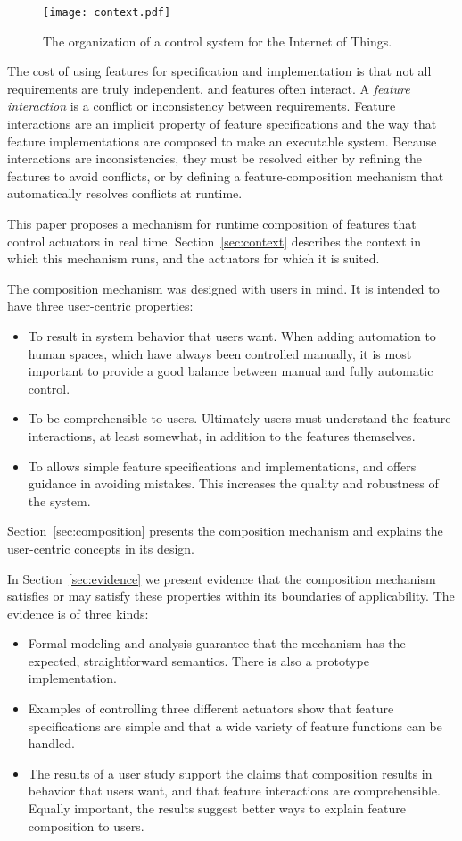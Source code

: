 \documentclass[conference]{IEEEtran}
\begin{document}
\begin{figure*}[!t]
\centering
\texttt{[image: context.pdf]}
\caption{The organization of a control system for the Internet of Things.}
\label{fig:context}
\end{figure*}

The cost of using features for specification and implementation is
that not all requirements are truly independent, and features often
interact.
A {\it feature interaction} is a conflict
or inconsistency between requirements.
Feature interactions are an implicit property of feature specifications
and the way that feature implementations
are composed to make an executable system.
Because interactions are inconsistencies, they must be resolved either by
refining the features to avoid conflicts,
or by defining a feature-composition mechanism that
automatically resolves conflicts at runtime.

This paper proposes a mechanism for runtime composition of features
that control actuators in real time.
Section~\ref{sec:context} describes the context in which this mechanism
runs, and the actuators for which it is suited.

The composition mechanism was designed with users in mind.
It is intended to have three user-centric properties:
\begin{itemize}
\item
To result in system behavior that users want.
When adding automation to human spaces, which have always been controlled
manually, it is most important to provide a good balance between
manual and fully automatic control.
\item
To be comprehensible to users.
Ultimately users must understand the feature interactions, at
least somewhat, in addition
to the features themselves.
\item
To allows simple feature specifications and implementations,
and offers guidance in avoiding mistakes.
This increases the quality and robustness of the system.
\end{itemize}
Section~\ref{sec:composition} presents the composition mechanism and 
explains the user-centric concepts in its design.

In Section~\ref{sec:evidence} we present evidence that the composition
mechanism satisfies or may satisfy these properties within its
boundaries of applicability.
The evidence is of three kinds:
\begin{itemize}
\item
Formal modeling and analysis guarantee that the mechanism has the
expected, straightforward semantics.
There is also a prototype implementation.
\item
Examples of controlling three different actuators show that
feature specifications are simple and that a wide variety of feature
functions can be handled.
\item
The results of a user study support the claims that composition results
in behavior that users want, and that feature interactions are 
comprehensible.
Equally important, the results suggest better ways to explain feature
composition to users.
\end{itemize}
\end{document}
